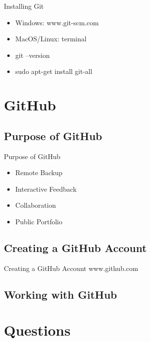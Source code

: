 \documentclass{beamer}
\begin{document}
\begin{frame}{Installing Git}
  \begin{itemize}
  \item {
    Windows: www.git-scm.com
    \pause
  }
  \item {
    MacOS/Linux: terminal
    \pause
  }
  \item{
	git --version 
	\pause 
  }
  \item{
	sudo apt-get install git-all  
  }
  \end{itemize}
\end{frame}

\section{GitHub}

\subsection{Purpose of GitHub}

\begin{frame}{Purpose of GitHub}
\begin{itemize}
  \item {
    Remote Backup
    \pause
  }
  \item {
    Interactive Feedback
    \pause
  }
  \item{
	Collaboration 
	\pause 
  }
  \item{
	Public Portfolio 
  }
  \end{itemize}
  \end{frame}

\subsection{Creating a GitHub Account}

\begin{frame}{Creating a GitHub Account}
www.github.com
\end{frame}

\subsection{Working with GitHub}

\section*{Questions}
\end{document}
